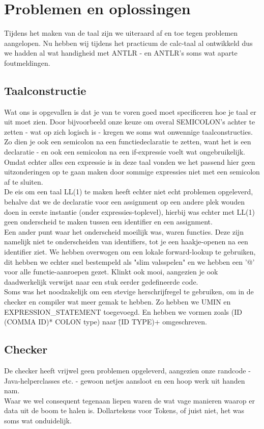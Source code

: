 \documentclass[]{article}
\begin{document}
\newpage
\section{Problemen en oplossingen}
Tijdens het maken van de taal zijn we uiteraard af en toe tegen problemen aangelopen. Nu hebben wij tijdens het practicum de calc-taal al ontwikkeld dus we hadden al wat handigheid met ANTLR - en ANTLR's soms wat aparte foutmeldingen.\\
\subsection{Taalconstructie}
Wat ons is opgevallen is dat je van te voren goed moet specificeren hoe je taal er uit moet zien. Door bijvoorbeeld onze keuze om overal SEMICOLON's achter te zetten - wat op zich logisch is - kregen we soms wat onwennige taalconstructies. Zo dien je ook een semicolon na een functiedeclaratie te zetten, want het is een declaratie - en ook een semicolon na een if-expressie voelt wat ongebruikelijk. Omdat echter alles een expressie is in deze taal vonden we het passend hier geen uitzonderingen op te gaan maken door sommige expressies niet met een semicolon af te sluiten. \\
De eis om een taal LL(1) te maken heeft echter niet echt problemen opgeleverd, behalve dat we de declaratie voor een assignment op een andere plek wouden doen in eerste instantie (onder expressies-toplevel), hierbij was echter met LL(1) geen onderscheid te maken tussen een identifier en een assignment.\\
Een ander punt waar het onderscheid moeilijk was, waren functies. Deze zijn namelijk niet te onderscheiden van identifiers, tot je een haakje-openen na een identifier ziet. We hebben overwogen om een lokale forward-lookup te gebruiken, dit hebben we echter snel bestempeld als "slim valsspelen" en we hebben een '@' voor alle functie-aanroepen gezet. Klinkt ook mooi, aangezien je ook daadwerkelijk verwijst naar een stuk eerder gedefineerde code.\\
Soms was het noodzakelijk om een stevige herschrijfregel te gebruiken, om in de checker en compiler wat meer gemak te hebben. Zo hebben we UMIN en EXPRESSION\_STATEMENT toegevoegd. En hebben we vormen zoals (ID (COMMA ID)* COLON type) naar \^(ID TYPE)+ omgeschreven.
\subsection{Checker}
De checker heeft vrijwel geen problemen opgeleverd, aangezien onze randcode - Java-helperclasses etc. - gewoon netjes aansloot en een hoop werk uit handen nam.\\
Waar we wel consequent tegenaan liepen waren de wat vage manieren waarop er data uit de boom te halen is. Dollartekens voor Tokens, of juist niet, het was soms wat onduidelijk.
\end{document}
